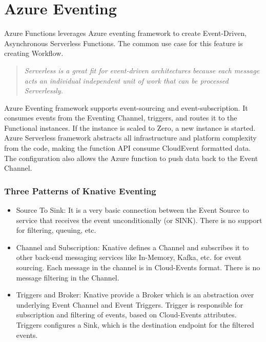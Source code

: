 \documentclass{article}
\begin{document}
\section{Azure Eventing}
\begin{flushleft}
Azure Functions leverages Azure eventing framework to create Event-Driven, Asynchronous Serverless Functions. The common use case for this feature is creating Workflow. 
\begin{quote}
    \textit{Serverless is a great fit for event-driven architectures because each message acts an individual independent unit of work that can be processed Serverlessly.} \cite{ANDERSON_2024}
\end{quote}

Azure Eventing framework supports event-sourcing and event-subscription. It consumes events from the Eventing Channel, triggers, and routes it to the Functional instances. If the instance is scaled to Zero, a new instance is started. Azure Serverless framework abstracts all infrastructure and platform complexity from the code, making the function API consume CloudEvent formatted data. The configuration also allows the Azure function to push data back to the Event Channel.

\subsubsection{Three Patterns of Knative Eventing}
\begin{itemize}
    \item Source To Sink: It is a very basic connection between the Event Source to service that receives the event unconditionally (or SINK). There is no support for filtering, queuing, etc.

    \item	Channel and Subscription: Knative defines a Channel and subscribes it to other back-end messaging services like In-Memory, Kafka, etc. for event sourcing. Each message in the channel is in Cloud-Events format. There is no message filtering in the Channel.

    \item Triggers and Broker: Knative provide a Broker which is an abstraction over underlying Event Channel and Event Triggers. Trigger is responsible for subscription and filtering of events, based on Cloud-Events attributes. Triggers configures a Sink, which is the destination endpoint for the filtered events. 
\end{itemize}
\end{flushleft}
\end{document}
